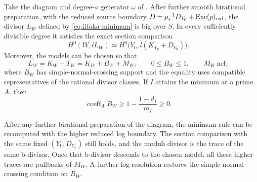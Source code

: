 \begin{proposition}
\label{prop:rank-one-base}
Take the diagram and degree-\(a\) generator \(\omega\) of
.  After further smooth
birational preparation, with the reduced source boundary
\(D=p_*^{-1}D_{Y_0}+\operatorname{Exc}(p)_{\rm red}\), the divisor
\(L_W\) defined by \eqref{eq:iitaka-minimum} is big over \(S\).
In every sufficiently divisible degree it satisfies the exact
section comparison
\begin{equation}\label{eq:iitaka-fixed-source}
 H^0(W,lL_W)\simeq
 H^0\bigl(Y_0,l(K_{Y_0}+D_{Y_0})\bigr).
\end{equation}
Moreover, the models can be chosen so that
\begin{equation}\label{eq:iitaka-bundle-formula}
 L_W=K_W+T_W=K_W+B_W+M_W,
 \qquad 0\le B_W\le1,
 \qquad M_W\ \text{nef},
\end{equation}
where \(B_W\) has simple-normal-crossing support and the equality uses
compatible representatives of the rational divisor classes.  If \(I\)
attains the minimum at a prime \(A\), then
\begin{equation}\label{eq:iitaka-discriminant-bound}
 \operatorname{coeff}_A B_W
       \ge 1-\frac{1-d_I}{m_I}\ge0.
\end{equation}

After any further birational preparation of the diagram, the minimum
rule can be recomputed with the higher reduced log boundary.  The
section comparison with the same fixed \((Y_0,D_{Y_0})\) still holds, and
the moduli divisor is the trace of the same b-divisor.  Once that
b-divisor descends to the chosen model, all these higher traces are
pullbacks of \(M_W\).  A further log resolution restores the
simple-normal-crossing condition on \(B_W\).
\end{proposition}

